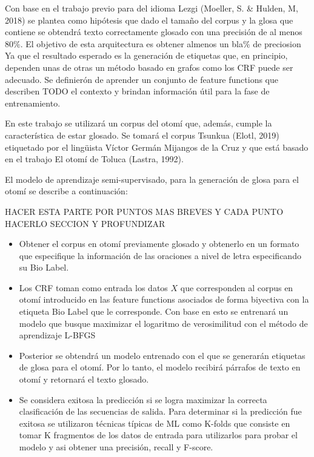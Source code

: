 \documentclass[letterpaper,12pt,oneside]{book}
\begin{document}
Con base en el trabajo previo para del idioma Lezgi (Moeller, S. \& Hulden, M, 2018) se plantea como hipótesis que dado el tamaño del corpus y la glosa que contiene
se obtendrá texto correctamente glosado con una precisión de al menos 80\%. El objetivo de esta arquitectura es obtener almenos un bla\% de preciosion
Ya que el resultado esperado es la generación de etiquetas que, en principio,
dependen unas de otras un método basado en grafos como los CRF puede ser
adecuado. Se definierón de aprender un conjunto de feature functions que
describen TODO el contexto y brindan información útil para la fase de
entrenamiento.

En este trabajo se utilizará un corpus del otomí que, además, cumple la
característica de estar glosado. Se tomará el corpus Tsunkua (Elotl, 2019)
etiquetado por el lingüista Víctor Germán Mijangos de la Cruz y que está basado
en el trabajo El otomí de Toluca (Lastra, 1992).

El modelo de aprendizaje semi-supervisado, para la generación de glosa para
el otomí se describe a continuación:

HACER ESTA PARTE POR PUNTOS MAS BREVES Y CADA PUNTO HACERLO SECCION Y PROFUNDIZAR

\begin{itemize}
	\item Obtener el corpus en otomí previamente glosado y obtenerlo en un
		formato que especifique la información de las oraciones a nivel
		de letra especificando su Bio Label.
	\item Los CRF toman como entrada los datos $X$ que corresponden al
		corpus en otomí introducido en las feature functions asociados
		de forma biyectiva con la etiqueta Bio Label que le corresponde.
		Con base en esto se entrenará un modelo que busque maximizar el
		logaritmo de verosimilitud con el método de aprendizaje L-BFGS
	\item Posterior se obtendrá un modelo entrenado con el que se generarán
		etiquetas de glosa para el otomí. Por lo tanto, el modelo
		recibirá párrafos de texto en otomí y retornará el texto
		glosado.
	\item Se considera exitosa la predicción si se logra maximizar la
		correcta clasificación de las secuencias de salida. Para
		determinar si la predicción fue exitosa se utilizaron técnicas
		típicas de ML como K-folds que consiste en tomar K fragmentos
		de los datos de entrada para utilizarlos para probar el modelo
		y asi obtener una precisión, recall y F-score.
\end{itemize}
\end{document}
